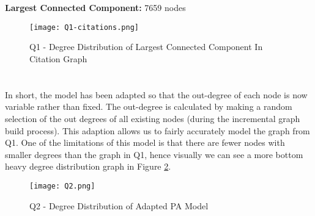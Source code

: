 \section{}
\textbf{Largest Connected Component: } 7659 nodes

\begin{figure}[h!]
    \begin{center}
        \texttt{[image: Q1-citations.png]}
        \caption{Q1 - Degree Distribution of Largest Connected Component In Citation Graph}
        \label{fig:Q1}
    \end{center}
\end{figure}

\section{}
In short, the model has been adapted so that the out-degree of each node is now variable rather than fixed.
The out-degree is calculated by making a random selection of the out degrees of all existing nodes (during the incremental graph build process).
This adaption allows us to fairly accurately model the graph from Q1.
One of the limitations of this model is that there are fewer nodes with smaller degrees than the graph in Q1, hence visually we can see a more bottom heavy degree distribution graph in Figure \ref{fig:Q2}. 
\begin{figure}[h!]
    \begin{center}
        \texttt{[image: Q2.png]}
        \caption{Q2 - Degree Distribution of Adapted PA Model}
        \label{fig:Q2}
    \end{center}
\end{figure}